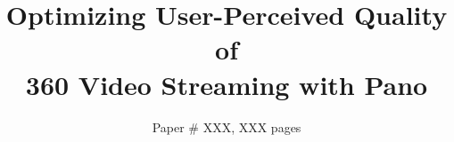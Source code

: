 \documentclass[sigconf]{acmart}
\newcommand{\jc}[1]{{\color{blue}{[JC: #1]}}}
\newcommand{\name}{{Pano}\xspace}
\newcommand{\vr}{{360\textdegree}\xspace}
\begin{document}
\title{Optimizing User-Perceived Quality of\\ \vr Video Streaming with \name}


\author{Paper \# XXX, XXX pages}

\renewcommand{\shortauthors}{X.et al.}

\begin{abstract}

\end{abstract}

\maketitle







\newpage
\jc{filling text to resolve vbox errors}





\end{document}
